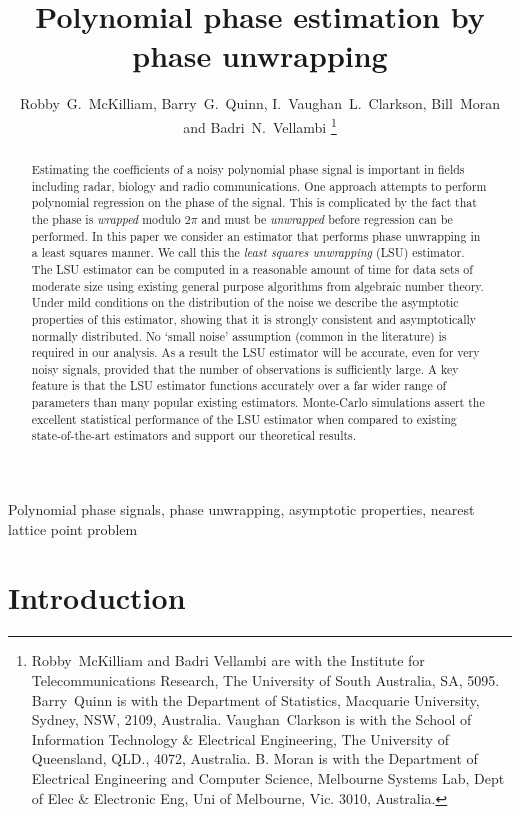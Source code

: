 \documentclass[journal]{IEEEtran}
\title{Polynomial phase estimation by phase unwrapping}
\author{Robby~G.~McKilliam, Barry~G.~Quinn, I.~Vaughan~L.~Clarkson, Bill~Moran and Badri~N.~Vellambi%
    \thanks{%
Robby~McKilliam and Badri Vellambi are with the Institute for Telecommunications Research, The University of South Australia, SA, 5095.  Barry~Quinn is with the Department of Statistics, Macquarie University, Sydney, NSW, 2109, Australia.   Vaughan~Clarkson is with the School of Information Technology \& Electrical Engineering, The University of Queensland, QLD., 4072, Australia.  B. Moran is with the Department of Electrical Engineering and Computer
Science, Melbourne Systems Lab, Dept of Elec \& Electronic Eng, Uni of Melbourne, Vic. 3010, Australia.}}
\begin{document}
 
\maketitle

\begin{abstract}
Estimating the coefficients of a noisy polynomial phase signal is important in fields including radar, biology and radio communications. One approach attempts to perform polynomial regression on the phase of the signal.  This is complicated by the fact that the phase is \emph{wrapped} modulo $2\pi$ and must be \emph{unwrapped} before regression can be performed.  In this paper we consider an estimator that performs phase unwrapping in a least squares manner.  We call this the \emph{least squares unwrapping} (LSU) estimator.  The LSU estimator can be computed in a reasonable amount of time for data sets of moderate size using existing general purpose algorithms from algebraic number theory.  Under mild conditions on the distribution of the noise we describe the asymptotic properties of this estimator, showing that it is strongly consistent and asymptotically normally distributed.  No `small noise' assumption (common in the literature) is required in our analysis.  As a result the LSU estimator will be accurate, even for very noisy signals, provided that the number of observations is sufficiently large.  A key feature is that the LSU estimator functions accurately over a far wider range of parameters than many popular existing estimators.  Monte-Carlo simulations assert the excellent statistical performance of the LSU estimator when compared to existing state-of-the-art estimators and support our theoretical results.
\end{abstract}

\begin{keywords}
Polynomial phase signals, phase unwrapping, asymptotic properties, nearest lattice point problem
\end{keywords}
 
%

\section{Introduction} \label{intro}
\end{document}
